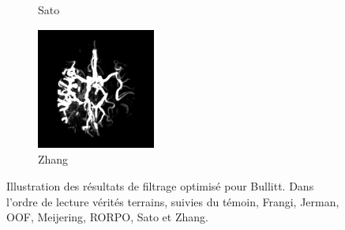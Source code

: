 \begin{figure}[!ht]
\begin{subfigure}[t]{0.32\textwidth}
  \caption{Sato}
  \end{subfigure}
  \begin{subfigure}[t]{0.32\textwidth}
  \includegraphics[clip = true, trim = 90 20 90 20, height=4cm,width=3.9cm]{Images/Bullitt_Zhang.png}
  \caption{Zhang}
  \end{subfigure}
  \centering
  \caption{Illustration des résultats de filtrage optimisé pour Bullitt.
  Dans l'ordre de lecture vérités terrains, suivies du témoin, Frangi, Jerman, OOF, Meijering, RORPO, Sato et Zhang.}
  \label{fig:qualitative results VascuSynth}
\end{figure}

